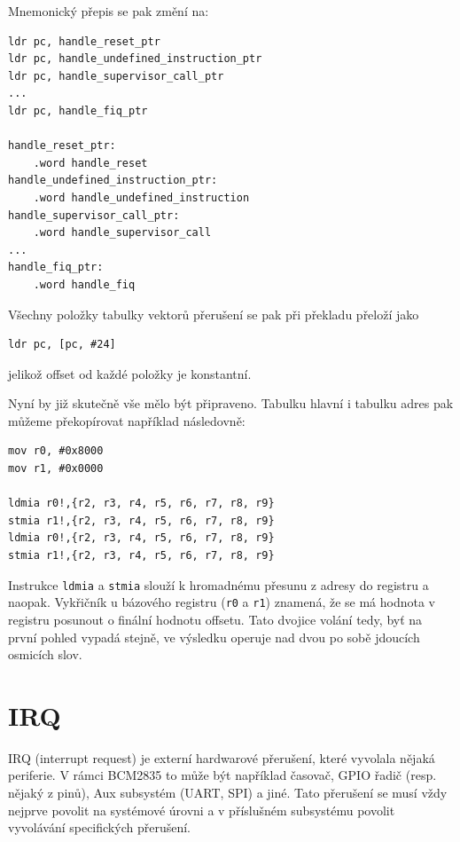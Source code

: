 \documentclass{article}
\begin{document}
Mnemonický přepis se pak změní na:

\begin{lstlisting}
ldr pc, handle_reset_ptr
ldr pc, handle_undefined_instruction_ptr
ldr pc, handle_supervisor_call_ptr
...
ldr pc, handle_fiq_ptr

handle_reset_ptr:
	.word handle_reset
handle_undefined_instruction_ptr:
	.word handle_undefined_instruction
handle_supervisor_call_ptr:
	.word handle_supervisor_call
...
handle_fiq_ptr:
	.word handle_fiq
\end{lstlisting}

Všechny položky tabulky vektorů přerušení se pak při překladu přeloží jako
\begin{lstlisting}
ldr	pc, [pc, #24]
\end{lstlisting}
jelikož offset od každé položky je konstantní.

Nyní by již skutečně vše mělo být připraveno. Tabulku hlavní i tabulku adres pak můžeme překopírovat například následovně:

\begin{lstlisting}
mov r0, #0x8000
mov r1, #0x0000

ldmia r0!,{r2, r3, r4, r5, r6, r7, r8, r9}
stmia r1!,{r2, r3, r4, r5, r6, r7, r8, r9}
ldmia r0!,{r2, r3, r4, r5, r6, r7, r8, r9}
stmia r1!,{r2, r3, r4, r5, r6, r7, r8, r9}
\end{lstlisting}

Instrukce \texttt{ldmia} a \texttt{stmia} slouží k hromadnému přesunu z adresy do registru a naopak. Vykřičník u bázového registru (\texttt{r0} a \texttt{r1}) znamená, že se má hodnota v registru posunout o finální hodnotu offsetu. Tato dvojice volání tedy, byť na první pohled vypadá stejně, ve výsledku operuje nad dvou po sobě jdoucích osmicích slov.

\section{IRQ}

IRQ (interrupt request) je externí hardwarové přerušení, které vyvolala nějaká periferie. V rámci BCM2835 to může být například časovač, GPIO řadič (resp. nějaký z pinů), Aux subsystém (UART, SPI) a jiné. Tato přerušení se musí vždy nejprve povolit na systémové úrovni a v příslušném subsystému povolit vyvolávání specifických přerušení.
\end{document}
